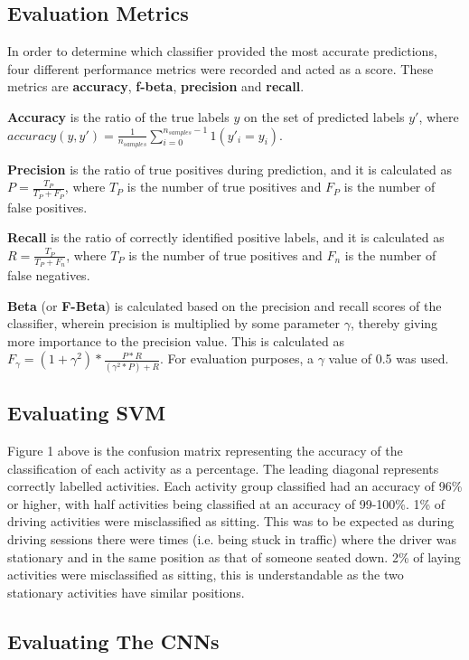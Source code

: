 \subsection{Evaluation Metrics}

In order to determine which classifier provided the most accurate predictions, four different performance metrics were recorded and acted as a score. These metrics are \textbf{accuracy},
\textbf{f-beta}, \textbf{precision} and \textbf{recall}.

\textbf{Accuracy} is the ratio of the true labels $y$ on the set of predicted labels $y'$, where \(accuracy(y, y') = \frac{1}{n_{samples}}\sum_{i=0}^{n_{samples}-1} 1(y'_i = y_i)\).

\textbf{Precision} is the ratio of true positives during prediction, and it is calculated as \(P = \frac{T_P}{T_P+F_P}\), where \(T_P\) is the number of true positives and \(F_P\) is the number of false positives.

\textbf{Recall} is the ratio of correctly identified positive labels, and it is calculated as \(R = \frac{T_P}{T_P+F_n}\), where \(T_P\) is the number of true positives and \(F_n\) is the number of false negatives.

\textbf{Beta} (or \textbf{F-Beta})  is calculated based on the precision and recall scores of the classifier, wherein precision is multiplied by some parameter $\gamma$, thereby giving more
importance to the precision value. This is calculated as \(F_\gamma = (1+\gamma^2) * \frac{P*R}{(\gamma^2*P)+R}\). For evaluation purposes, a $\gamma$ value of 0.5 was used.

\subsection{Evaluating SVM}

Figure 1 above is the confusion matrix representing the accuracy of the classification of each activity as a percentage. The leading diagonal represents correctly labelled activities. Each activity group classified had an accuracy of 96\% or higher, with half activities being classified at an accuracy of 99-100\%.
1\% of driving activities were misclassified as sitting. This was to be expected as during driving sessions there were times (i.e. being stuck in traffic) where the driver was stationary and in the same position as that of someone seated down.
2\% of laying activities were misclassified as sitting, this is understandable as the two stationary activities have similar positions.

\subsection{Evaluating The CNNs}